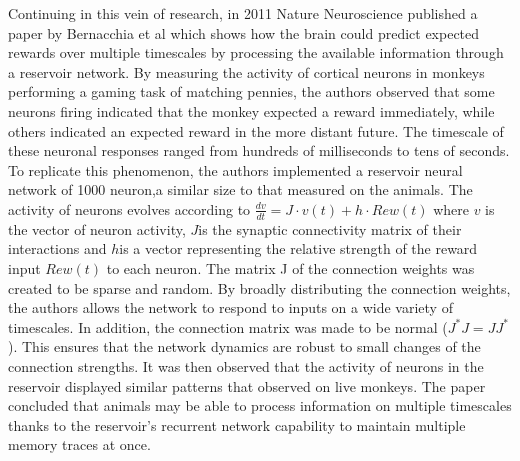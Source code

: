 \documentclass[12pt,oneside]{CUNY_CS_PhD}
\begin{document}
Continuing in this vein of research, in 2011 Nature Neuroscience published a paper by Bernacchia et al \cite{bernacchia_reservoir_2011} which shows how the brain could predict expected rewards over multiple timescales by processing the available information through a reservoir network. By measuring the activity of cortical neurons in monkeys performing a gaming task of matching pennies, the authors observed that some neurons firing indicated that the monkey expected a reward immediately, while others indicated an expected reward in the more distant future. The timescale of these neuronal responses ranged from hundreds of milliseconds to tens of seconds. To replicate this phenomenon, the authors implemented a reservoir neural network of 1000 neuron,a similar size to that measured on the animals. The activity of neurons evolves according to $\frac{dv}{dt} = J \cdot v(t) + h \cdot Rew(t)$ where $v$ is the vector of neuron activity, $J$is the synaptic connectivity matrix of their interactions and $h$is a vector representing the relative strength of the reward input $Rew(t)$ to each neuron. The matrix J of the connection weights was created to be sparse and random. By broadly distributing the connection weights, the authors allows the network to respond to inputs on a wide variety of timescales. In addition, the connection matrix was made to be normal ($J^*J = JJ^*$). This ensures \cite{spectra} that the network dynamics are robust to small changes of the connection strengths. It was then observed that the activity of neurons in the reservoir displayed similar patterns that observed on live monkeys. The paper concluded that animals may be able to process information on multiple timescales thanks to the reservoir's recurrent network capability to maintain multiple memory traces at once.
\end{document}
